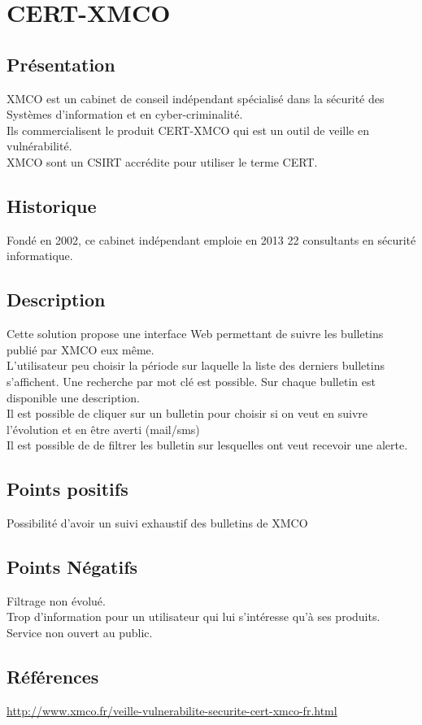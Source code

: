 \section{CERT-XMCO}
\thispagestyle{plain}
\subsection{Présentation}
XMCO est un cabinet de conseil indépendant spécialisé dans la sécurité des Systèmes d’information et en cyber-criminalité.\\
Ils commercialisent le produit CERT-XMCO qui est un outil de veille en vulnérabilité.\\
XMCO sont un CSIRT accrédite pour utiliser le terme CERT.\\

\subsection{Historique}
Fondé en 2002, ce cabinet indépendant emploie en 2013 22 consultants en sécurité informatique.

\subsection{Description}
Cette solution propose une interface Web permettant de suivre les bulletins publié par XMCO eux même.\\
L’utilisateur peu choisir la période sur laquelle la liste des derniers bulletins s’affichent. Une recherche par mot clé est possible. Sur chaque bulletin est disponible une description.\\
Il est possible de cliquer sur un bulletin pour choisir si on veut en suivre l’évolution et en être averti (mail/sms)\\
Il est possible de de filtrer les bulletin sur lesquelles ont veut recevoir une alerte.\\

\subsection{Points positifs}
Possibilité d’avoir un suivi exhaustif des bulletins de XMCO

\subsection{Points Négatifs}
Filtrage non évolué.\\
Trop d’information pour un utilisateur qui lui s’intéresse qu’à ses produits.\\
Service non ouvert au public.\\

\subsection{Références}
\small
\noindent
\url{http://www.xmco.fr/veille-vulnerabilite-securite-cert-xmco-fr.html}
\normalsize
